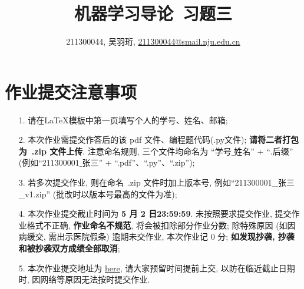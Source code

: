 \documentclass[a4paper,UTF8]{article}
\numberwithin{equation}{section}
\theoremstyle{definition}
\begin{document}
\title{机器学习导论\ 习题三}
\author{211300044, 吴羽珩, \href{mailto:邮箱}{211300044@smail.nju.edu.cn}}
\maketitle
\section*{作业提交注意事项}
\begin{tcolorbox}
	\begin{enumerate}
		\item[1.] 请在LaTeX模板中第一页填写个人的学号、姓名、邮箱;
		\item[2.] 本次作业需提交作答后的该 pdf 文件、编程题代码(.py文件); {\color{red}\textbf{请将二者打包为~.zip 文件上传}}. 注意命名规则, 三个文件均命名为 “$\text{学号}\_\text{姓名}$” + “$.\text{后缀}$” (例如“$\text{211300001}\_\text{张三}$” + “.pdf”、“.py”、“.zip”);
		\item[3.] 若多次提交作业, 则在命名~.zip 文件时加上版本号, 例如“211300001\_张三\_v1.zip” (批改时以版本号最高的文件为准);
		\item[4.] 本次作业提交截止时间为 {\color{red}\textbf{ 5 月 2 日23:59:59}}. 未按照要求提交作业, 提交作业格式不正确, {\color{red}\textbf{作业命名不规范}}, 将会被扣除部分作业分数; 除特殊原因 (如因病缓交, 需出示医院假条) 逾期未交作业, 本次作业记 0 分; {\color{red}\textbf{如发现抄袭, 抄袭和被抄袭双方成绩全部取消}};
		\item[5.] 本次作业提交地址为 \href{https://box.nju.edu.cn/u/d/71102ced9a9b4d6f8d05/}{here}, 请大家预留时间提前上交, 以防在临近截止日期时, 因网络等原因无法按时提交作业.
	\end{enumerate}
\end{tcolorbox}
\newpage
\end{document}
